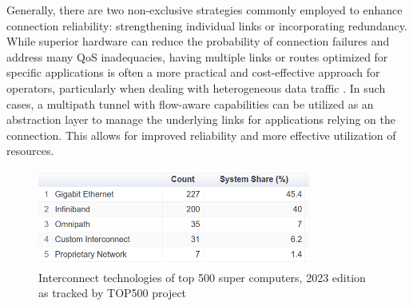 Generally, there are two non-exclusive strategies commonly employed to enhance connection reliability: strengthening individual links or incorporating redundancy.
While superior hardware can reduce the probability of connection failures and address many \ac{QoS} inadequacies, having multiple links or routes optimized for specific applications is often a more practical and cost-effective approach for operators, particularly when dealing with heterogeneous data traffic \cite{chen_overview_1998}.
In such cases, a multipath tunnel with flow-aware capabilities can be utilized as an abstraction layer to manage the underlying links for applications relying on the connection. 
This allows for improved reliability and more effective utilization of resources. 
 



\begin{figure}[H]
	\centering
	\includegraphics[width=0.8\textwidth]{resources/images/Interconnect_Technologies_500_supercomp.PNG}
	\caption{Interconnect technologies of top 500 super computers, 2023 edition as tracked by TOP500 project \cite{Interconnect_Technologies_500_supercomp}}
    \label{fig:introduction:Interconnect_Technologies_500_supercomp}
\end{figure}

